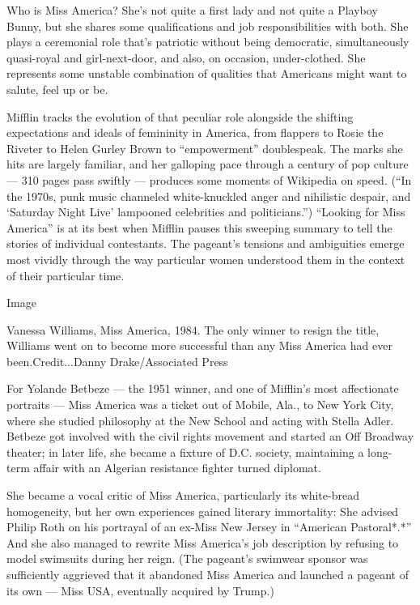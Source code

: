 Who is Miss America? She's not quite a first lady and not quite a
Playboy Bunny, but she shares some qualifications and job
responsibilities with both. She plays a ceremonial role that's patriotic
without being democratic, simultaneously quasi-royal and girl-next-door,
and also, on occasion, under-clothed. She represents some unstable
combination of qualities that Americans might want to salute, feel up or
be.

Mifflin tracks the evolution of that peculiar role alongside the
shifting expectations and ideals of femininity in America, from flappers
to Rosie the Riveter to Helen Gurley Brown to ``empowerment''
doublespeak. The marks she hits are largely familiar, and her galloping
pace through a century of pop culture --- 310 pages pass swiftly ---
produces some moments of Wikipedia on speed. (``In the 1970s, punk music
channeled white-knuckled anger and nihilistic despair, and `Saturday
Night Live' lampooned celebrities and politicians.'') ``Looking for Miss
America'' is at its best when Mifflin pauses this sweeping summary to
tell the stories of individual contestants. The pageant's tensions and
ambiguities emerge most vividly through the way particular women
understood them in the context of their particular time.

Image

Vanessa Williams, Miss America, 1984. The only winner to resign the
title, Williams went on to become more successful than any Miss America
had ever been.Credit...Danny Drake/Associated Press

For Yolande Betbeze --- the 1951 winner, and one of Mifflin's most
affectionate portraits --- Miss America was a ticket out of Mobile,
Ala., to New York City, where she studied philosophy at the New School
and acting with Stella Adler. Betbeze got involved with the civil rights
movement and started an Off Broadway theater; in later life, she became
a fixture of D.C. society, maintaining a long-term affair with an
Algerian resistance fighter turned diplomat.

She became a vocal critic of Miss America, particularly its white-bread
homogeneity, but her own experiences gained literary immortality: She
advised Philip Roth on his portrayal of an ex-Miss New Jersey in
``American Pastoral*.*'' And she also managed to rewrite Miss America's
job description by refusing to model swimsuits during her reign. (The
pageant's swimwear sponsor was sufficiently aggrieved that it abandoned
Miss America and launched a pageant of its own --- Miss USA, eventually
acquired by Trump.)

